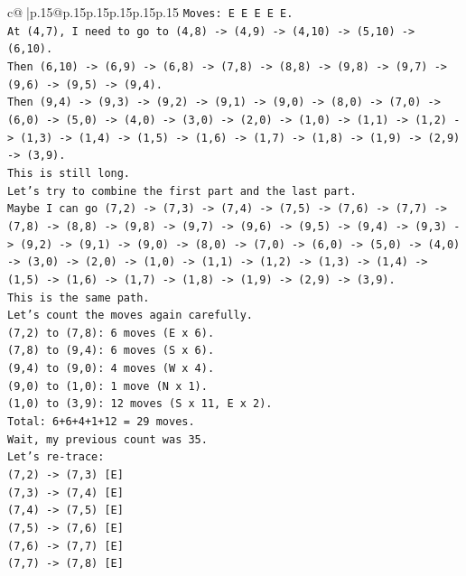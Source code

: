 \documentclass{article}
\begin{document}
{\begin{supertabular}{c@{$\;$}|p{.15\linewidth}@{}p{.15\linewidth}p{.15\linewidth}p{.15\linewidth}p{.15\linewidth}p{.15\linewidth}}
{{{\texttt{Moves: E E E E E.} \\
\texttt{At (4,7), I need to go to (4,8) {-}> (4,9) {-}> (4,10) {-}> (5,10) {-}> (6,10).} \\
\texttt{Then (6,10) {-}> (6,9) {-}> (6,8) {-}> (7,8) {-}> (8,8) {-}> (9,8) {-}> (9,7) {-}> (9,6) {-}> (9,5) {-}> (9,4).} \\
\texttt{Then (9,4) {-}> (9,3) {-}> (9,2) {-}> (9,1) {-}> (9,0) {-}> (8,0) {-}> (7,0) {-}> (6,0) {-}> (5,0) {-}> (4,0) {-}> (3,0) {-}> (2,0) {-}> (1,0) {-}> (1,1) {-}> (1,2) {-}> (1,3) {-}> (1,4) {-}> (1,5) {-}> (1,6) {-}> (1,7) {-}> (1,8) {-}> (1,9) {-}> (2,9) {-}> (3,9).} \\
\texttt{This is still long.} \\
\texttt{Let's try to combine the first part and the last part.} \\
\texttt{Maybe I can go (7,2) {-}> (7,3) {-}> (7,4) {-}> (7,5) {-}> (7,6) {-}> (7,7) {-}> (7,8) {-}> (8,8) {-}> (9,8) {-}> (9,7) {-}> (9,6) {-}> (9,5) {-}> (9,4) {-}> (9,3) {-}> (9,2) {-}> (9,1) {-}> (9,0) {-}> (8,0) {-}> (7,0) {-}> (6,0) {-}> (5,0) {-}> (4,0) {-}> (3,0) {-}> (2,0) {-}> (1,0) {-}> (1,1) {-}> (1,2) {-}> (1,3) {-}> (1,4) {-}> (1,5) {-}> (1,6) {-}> (1,7) {-}> (1,8) {-}> (1,9) {-}> (2,9) {-}> (3,9).} \\
\texttt{This is the same path.} \\
\texttt{Let's count the moves again carefully.} \\
\texttt{(7,2) to (7,8): 6 moves (E x 6).} \\
\texttt{(7,8) to (9,4): 6 moves (S x 6).} \\
\texttt{(9,4) to (9,0): 4 moves (W x 4).} \\
\texttt{(9,0) to (1,0): 1 move (N x 1).} \\
\texttt{(1,0) to (3,9): 12 moves (S x 11, E x 2).} \\
\texttt{Total: 6+6+4+1+12 = 29 moves.} \\
\texttt{Wait, my previous count was 35.} \\
\texttt{Let's re{-}trace:} \\
\texttt{(7,2) {-}> (7,3) {[}E{]}} \\
\texttt{(7,3) {-}> (7,4) {[}E{]}} \\
\texttt{(7,4) {-}> (7,5) {[}E{]}} \\
\texttt{(7,5) {-}> (7,6) {[}E{]}} \\
\texttt{(7,6) {-}> (7,7) {[}E{]}} \\
\texttt{(7,7) {-}> (7,8) {[}E{]}} \\
}}}
\end{supertabular}}
\end{document}

